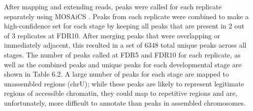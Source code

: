 After mapping and extending reads, peaks were called for each replicate separately using MOSAiCS \citep{mosaics}. Peaks from each replicate were combined to make a high-confidence set for each stage by keeping all peaks that are present in 2 out of 3 replicates at FDR10. After merging peaks that were overlapping or immediately adjacent, this resulted in a set of 6348 total unique peaks across all stages. The number of peaks called at FDR5 and FDR10 for each replicate, as well as the combined peaks and unique peaks for each developmental stage are shown in Table 6.2. A large number of peaks for each stage are mapped to unassembled regions (chrU); while these peaks are likely to represent legitimate regions of accessible chromatin, they could map to repetitive regions and are, unfortunately, more difficult to annotate than peaks in assembled chromosomes.\\

